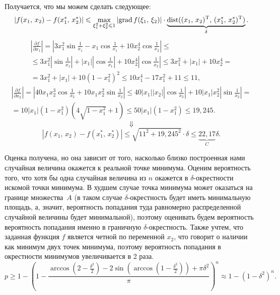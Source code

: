 Получается, что мы можем сделать следующее:
$$
      |f(x_1,\,x_2) - f(x_1^*,\,x_2^*)|
\leqslant
        \max\limits_{\xi_1^2 + \xi_2^2 \leqslant 1} |\mbox{grad}\,f(\xi_1,\,\xi_2)|\cdot\underbrace{\mbox{dist}((x_1,\,x_2)^{\mathrm{T}},\,(x_1^*,\,x_2^*)^{\mathrm{T}})}_{\delta}.  
$$
\begin{multline*}
        \left|
\frac{\partial f}{\partial x_1}
        \right|
=
        \left|
3x_1^2\sin\frac{1}{x_1} - x_1\cos\frac1{x_1} + 10x_2^4\cos\frac1{x_2}
        \right|
\leqslant \\ \leqslant
        3x_1^2\left|\sin\frac1{x_1}\right| + |x_1|\left|\cos\frac1{x_1}\right| + 10x_2^4\left|\cos\frac1{x_2}\right|
\leqslant
        3x_1^2 + |x_1| + 10x_2^4
= \\ =
        3x_1^2 + |x_1| + 10(1 - x_1^2)^2
\leqslant
        10x_1^4 - 17x_1^2 +  11
\leqslant
        11,
\end{multline*}
\begin{multline*}
        \left|
\frac{\partial f}{\partial x_2}
        \right|
=
        \left|
40x_1x_2^3\cos\frac1{x_2} + 10x_1x_2^2\sin\frac1{x_2}
        \right|
\leqslant
        40|x_1||x_2|\left|\cos\frac1{x_2}\right| + 10 |x_1|x_2^2\left|\sin\frac1{x_2}\right|
= \\ =
        10 |x_1| (1 - x_1^2)\left( 4\sqrt{1 - x_1^2} + 1 \right)
\leqslant
        50|x_1|(1 - x_1^2)
\leqslant
        19,\!245.
\end{multline*}
$$
        \Downarrow
$$
$$
        |f(x_1,\,x_2) - f(x_1^*,\,x_2^*)|
\leqslant
        \sqrt{11^2 + 19,\!245^2}\cdot\delta
\leqslant
        \underbrace{22,\!17}_{C}\delta.
$$

Оценка получена, но она зависит от того, насколько близко построенная нами случайная величина окажется к реальной точке минимума. Оценим вероятность того, что хотя бы одна случайная величина из $n$ окажется в $\delta$-окрестности искомой точки минимума. В худшем случае точка минимума может оказаться на границе множества~$A$ (в таком случае $\delta$-окрестность будет иметь минимальную площадь, а, значит, вероятность попадания туда равномерно распределенной случайной величины будет минимальной), поэтому оценивать будем вероятность вероятность попадания именно в граничную $\delta$-окрестность. Также учтем, что заданная функция $f$ является четной по переменной $x_2$, что говорит о наличии как минимум двух точек минимума, поэтому вероятность попадания в окрестности минимумов увеличивается в 2 раза.
$$
        p
\geqslant
        1 - \left( 1 - \frac{\arccos(2 - \frac{\delta^2}{2}) - 2\sin\left(\arccos(1 - \frac{\delta^2}{2})\right) + \pi\delta^2}{\pi}\right)^n
\approx
        1 - (1 - \delta^2)^n. 
$$

